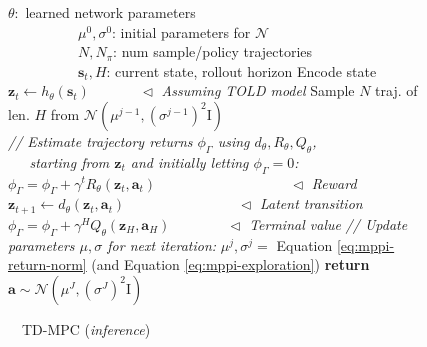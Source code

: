 \documentclass{article}
\begin{document}
\begin{figure}[t]
\vspace{-0.15in}
\begin{algorithm}[H]
\caption{~~TD-MPC {\color{CadetBlue}(\emph{inference})}}
\label{alg:inference}
\begin{algorithmic}[1]
\REQUIRE $\theta:$ learned network parameters\\
~~~~~~~~~~$\mu^{0}, \sigma^{0}$: initial parameters for $\mathcal{N}$\\
~~~~~~~~~~$N, N_{\pi}$: num sample/policy trajectories\\
~~~~~~~~~~$\mathbf{s}_{t}, H$: current state, rollout horizon
\STATE Encode state $\mathbf{z}_{t} \leftarrow h_{\theta}(\mathbf{s}_{t})$~~~~~~~$\vartriangleleft$ {\color{CadetBlue}\emph{Assuming TOLD model}}
\STATE Sample $N$ traj. of len. $H$ from $\mathcal{N}(\mu^{j-1}, (\sigma^{j-1})^{2} \mathrm{I})$
\\ {\color{CadetBlue} \emph{// Estimate trajectory returns $\phi_{\Gamma}$ using $d_{\theta},R_{\theta},Q_{\theta}$,\\~~~starting from $\mathbf{z}_{t}$ and initially letting $\phi_{\Gamma}=0$:}}
{\color{BrickRed}
\STATE $\phi_{\Gamma} = \phi_{\Gamma} + \gamma^{t} R_{\theta}(\mathbf{z}_{t}, \mathbf{a}_{t})$~~~~~~~~~~~~~~~~~~~{\color{CadetBlue}$\vartriangleleft$ \emph{Reward}}
\STATE $\mathbf{z}_{t+1} \leftarrow d_{\theta}(\mathbf{z}_{t}, \mathbf{a}_{t})$~~~~~~~~~~~~~~~~{\color{CadetBlue}$\vartriangleleft$ \emph{Latent transition}}
\ENDFOR
\STATE $\phi_{\Gamma} = \phi_{\Gamma} + \gamma^{H} Q_{\theta}(\mathbf{z}_{H}, \mathbf{a}_{H})$~~~~~~~~{\color{CadetBlue}$\vartriangleleft$ \emph{Terminal value}}}
\ENDFOR
{\color{CadetBlue} \emph{// Update parameters $\mu,\sigma$ for next iteration:}}
\STATE $\mu^{j}, \sigma^{j} =$ Equation \ref{eq:mppi-return-norm} (and Equation \ref{eq:mppi-exploration})
\ENDFOR
\STATE \textbf{return} $\mathbf{a} \sim \mathcal{N}(\mu^{J}, (\sigma^{J})^{2} \mathrm{I})$
\end{algorithmic}
\end{algorithm}
\vspace{-0.3in}
\end{figure}
\end{document}

